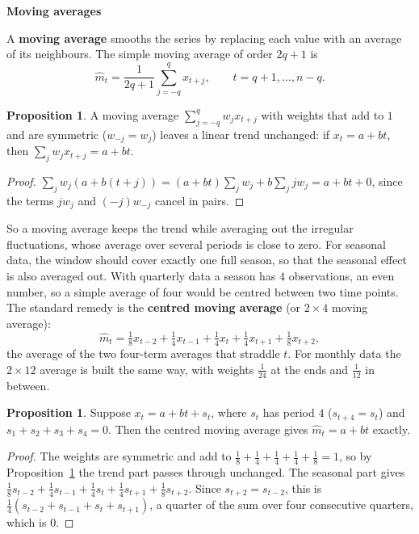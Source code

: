 \documentclass[11pt,a4paper]{article}
\theoremstyle{definition}
\newtheorem{prop}[thm]{Proposition}
\newcommand{\subhead}[1]{%
  \par\medskip\noindent\textbf{#1}\par\nobreak\smallskip}
\begin{document}
\subhead{Moving averages}
A \textbf{moving average} smooths the series by replacing each value with an average of its neighbours. The
simple moving average of order $2q + 1$ is
\[
\hat m_t = \frac{1}{2q + 1}\sum_{j=-q}^{q} x_{t+j} , \qquad t = q + 1, \dots, n - q .
\]

\begin{prop}\label{prop:ma-linear}
A moving average $\sum_{j=-q}^{q} w_jx_{t+j}$ with weights that add to $1$ and are symmetric ($w_{-j} = w_j$) leaves a linear trend
unchanged: if $x_t = a + bt$, then $\sum_j w_jx_{t+j} = a + bt$.
\end{prop}

\begin{proof}
$\sum_j w_j(a + b(t + j)) = (a + bt)\sum_j w_j + b\sum_j jw_j = a + bt + 0$, since the terms $jw_j$ and $(-j)w_{-j}$ cancel in pairs.
\end{proof}

So a moving average keeps the trend while averaging out the irregular fluctuations, whose average over
several periods is close to zero. For seasonal data, the window should cover exactly one full season, so that
the seasonal effect is also averaged out. With quarterly data a season has $4$ observations, an even number,
so a simple average of four would be centred between two time points. The standard remedy is the
\textbf{centred moving average} (or $2\times4$ moving average):
\[
\hat m_t = \tfrac18x_{t-2} + \tfrac14x_{t-1} + \tfrac14x_t + \tfrac14x_{t+1} + \tfrac18x_{t+2} ,
\]
the average of the two four-term averages that straddle $t$. For monthly data the $2\times12$ average is built the
same way, with weights $\frac{1}{24}$ at the ends and $\frac{1}{12}$ in between.

\begin{prop}\label{prop:centred-ma}
Suppose $x_t = a + bt + s_t$, where $s_t$ has period $4$ ($s_{t+4} = s_t$) and $s_1 + s_2 + s_3 + s_4 = 0$. Then the centred moving average
gives $\hat m_t = a + bt$ exactly.
\end{prop}

\begin{proof}
The weights are symmetric and add to $\frac18 + \frac14 + \frac14 + \frac14 + \frac18 = 1$, so by Proposition~\ref{prop:ma-linear} the trend part
passes through unchanged. The seasonal part gives $\frac18s_{t-2} + \frac14s_{t-1} + \frac14s_t + \frac14s_{t+1} + \frac18s_{t+2}$. Since $s_{t+2} = s_{t-2}$, this is
$\frac14(s_{t-2} + s_{t-1} + s_t + s_{t+1})$, a quarter of the sum over four consecutive quarters, which is $0$.
\end{proof}
\end{document}
